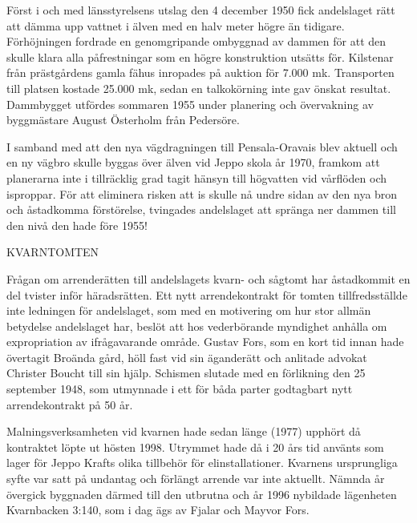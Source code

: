 Först i och med länsstyrelsens utslag den 4 december 1950 fick andelslaget rätt att dämma upp vattnet i älven med en halv meter högre än tidigare. Förhöjningen fordrade en genomgripande ombyggnad av dammen för att den skulle klara alla påfrestningar som en högre konstruktion utsätts för. Kilstenar från prästgårdens gamla fähus inropades på auktion för 7.000 mk. Transporten till platsen kostade 25.000 mk, sedan en talkokörning inte gav önskat resultat. Dammbygget utfördes sommaren 1955 under planering och övervakning av byggmästare August Österholm från Pedersöre.

I samband med att den nya vägdragningen till Pensala-Oravais blev aktuell och en ny vägbro skulle byggas över älven vid Jeppo skola år 1970,  framkom att planerarna inte i tillräcklig grad tagit hänsyn till högvatten vid vårflöden och isproppar. För att eliminera risken att is skulle nå undre sidan av den nya bron och åstadkomma förstörelse, tvingades andelslaget att spränga ner dammen till den nivå den hade före 1955!


KVARNTOMTEN

Frågan om arrenderätten till andelslagets kvarn- och sågtomt har åstadkommit en del tvister inför häradsrätten. Ett nytt arrendekontrakt för tomten tillfredsställde inte ledningen för andelslaget, som med en motivering om hur stor allmän betydelse andelslaget har, beslöt att hos vederbörande myndighet anhålla om expropriation av ifrågavarande område. Gustav Fors, som en kort tid innan hade övertagit Broända gård, höll fast vid sin äganderätt och anlitade advokat Christer Boucht till sin hjälp. Schismen slutade med en förlikning den 25 september 1948, som utmynnade i ett för båda parter godtagbart nytt arrendekontrakt på 50 år.

Malningsverksamheten vid kvarnen hade sedan länge (1977) upphört då kontraktet löpte ut hösten 1998. Utrymmet hade då i 20 års tid använts som lager för Jeppo Krafts olika tillbehör för elinstallationer. Kvarnens ursprungliga syfte var satt på undantag och förlängt arrende var inte aktuellt. Nämnda år övergick byggnaden därmed till den utbrutna och år 1996 nybildade lägenheten Kvarnbacken 3:140, som i dag ägs av Fjalar och Mayvor Fors.

